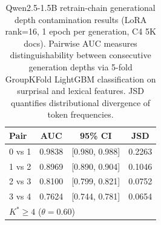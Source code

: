 \begin{table}[t]
\centering
\small
\caption{Qwen2.5-1.5B retrain-chain generational depth contamination results (LoRA rank=16, 1 epoch per generation, C4 5K docs). Pairwise AUC measures distinguishability between consecutive generation depths via 5-fold GroupKFold LightGBM classification on surprisal and lexical features. JSD quantifies distributional divergence of token frequencies.}
\label{tab:qwen_retrain}
\begin{tabular}{l c c c}
\toprule
Pair & AUC & 95\% CI & JSD \\
\midrule
0 vs 1 & 0.9838 & [0.980, 0.988] & 0.2263 \\
1 vs 2 & 0.8969 & [0.890, 0.904] & 0.1046 \\
2 vs 3 & 0.8100 & [0.799, 0.821] & 0.0752 \\
3 vs 4 & 0.7624 & [0.744, 0.781] & 0.0654 \\
\midrule
\multicolumn{4}{l}{$K^* \geq 4$ ($\theta = 0.60$)} \\
\bottomrule
\end{tabular}
\end{table}
